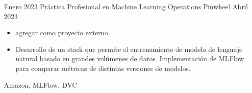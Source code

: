 \begin{experiences}
            \experience
        {Enero 2023}
        {Práctica Profesional en Machine Learning Operations}
        {Pinwheel}
        {Abril 2023}
        {
            \begin{itemize}
            \item agregar como proyecto externo
            \item Desarrollo de un stack que permite el entrenamiento de modelo de lenguaje natural basado en grandes volúmenes de datos. Implementación de MLFlow para comparar métricas de distintas versiones de modelos.
            \end{itemize}
        }
        {
            Amazon,
            MLFlow,
            DVC
        }
  

\end{experiences}
